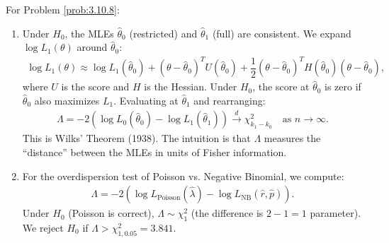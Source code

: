 \begin{solucion}
	\label{sol:3.10.8}
	For Problem \ref{prob:3.10.8}:
	\begin{enumerate}
		\item Under $H_{0}$, the MLEs $\hat{\theta}_{0}$ (restricted) and $\hat{\theta}_{1}$ (full) are consistent. We expand $\log L_{1}(\theta)$ around $\hat{\theta}_{0}$:
		\begin{align*}
			\log L_{1}(\theta) \approx \log L_{1}(\hat{\theta}_{0}) + (\theta - \hat{\theta}_{0})^{T} U(\hat{\theta}_{0}) + \dfrac{1}{2}(\theta - \hat{\theta}_{0})^{T} H(\hat{\theta}_{0}) (\theta - \hat{\theta}_{0}),
		\end{align*}
		where $U$ is the score and $H$ is the Hessian. Under $H_{0}$, the score at $\hat{\theta}_{0}$ is zero if $\hat{\theta}_{0}$ also maximizes $L_{1}$. Evaluating at $\hat{\theta}_{1}$ and rearranging:
		\begin{align*}
			\Lambda = -2(\log L_{0}(\hat{\theta}_{0}) - \log L_{1}(\hat{\theta}_{1})) \xrightarrow{d} \chi^{2}_{k_{1} - k_{0}} \quad \text{as } n \to \infty.
		\end{align*}
		This is Wilks' Theorem (1938). The intuition is that $\Lambda$ measures the ``distance'' between the MLEs in units of Fisher information.
		\item For the overdispersion test of Poisson vs. Negative Binomial, we compute:
		\begin{align*}
			\Lambda = -2(\log L_{\text{Poisson}}(\hat{\lambda}) - \log L_{\text{NB}}(\hat{r}, \hat{p})).
		\end{align*}
		Under $H_{0}$ (Poisson is correct), $\Lambda \sim \chi^{2}_{1}$ (the difference is $2 - 1 = 1$ parameter). We reject $H_{0}$ if $\Lambda > \chi^{2}_{1, 0.05} = 3.841$.
	\end{enumerate}
\end{solucion}

